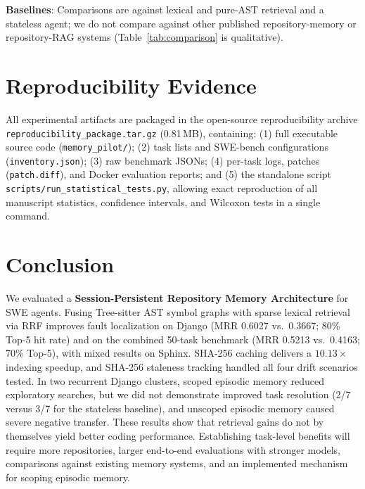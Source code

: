 \documentclass[conference]{IEEEtran}
\begin{document}
\textbf{Baselines}: Comparisons are against lexical and pure-AST retrieval and a stateless agent; we do not compare against other published repository-memory or repository-RAG systems (Table~\ref{tab:comparison} is qualitative).

\section{Reproducibility Evidence}
All experimental artifacts are packaged in the open-source reproducibility archive \texttt{reproducibility\_package.tar.gz} (0.81\,MB), containing: (1) full executable source code (\texttt{memory\_pilot/}); (2) task lists and SWE-bench configurations (\texttt{inventory.json}); (3) raw benchmark JSONs; (4) per-task logs, patches (\texttt{patch.diff}), and Docker evaluation reports; and (5) the standalone script \texttt{scripts/run\_statistical\_tests.py}, allowing exact reproduction of all manuscript statistics, confidence intervals, and Wilcoxon tests in a single command.

\section{Conclusion}
We evaluated a \textbf{Session-Persistent Repository Memory Architecture} for SWE agents. Fusing Tree-sitter AST symbol graphs with sparse lexical retrieval via RRF improves fault localization on Django (MRR 0.6027 vs.\ 0.3667; 80\% Top-5 hit rate) and on the combined 50-task benchmark (MRR 0.5213 vs.\ 0.4163; 70\% Top-5), with mixed results on Sphinx. SHA-256 caching delivers a $10.13\times$ indexing speedup, and SHA-256 staleness tracking handled all four drift scenarios tested. In two recurrent Django clusters, scoped episodic memory reduced exploratory searches, but we did not demonstrate improved task resolution (2/7 versus 3/7 for the stateless baseline), and unscoped episodic memory caused severe negative transfer. These results show that retrieval gains do not by themselves yield better coding performance. Establishing task-level benefits will require more repositories, larger end-to-end evaluations with stronger models, comparisons against existing memory systems, and an implemented mechanism for scoping episodic memory.



\end{document}
